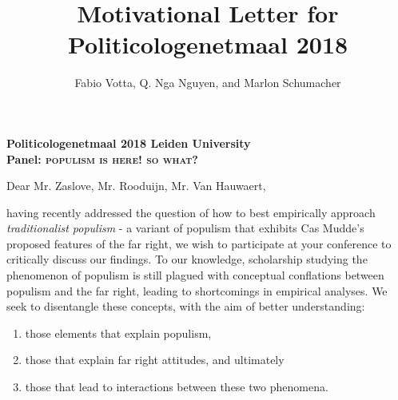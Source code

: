 \documentclass[10pt]{article}
\begin{document}
\title{Motivational Letter for Politicologenetmaal 2018}

\author{Fabio Votta, Q. Nga Nguyen, and Marlon Schumacher}

\address{B.A. University of Stuttgart, Department for Empirical Social Research, \href{fabio.votta@gmail.com}{fabio.votta@gmail.com}\\
B.A. Institut d'Etudes Politiques de Bordeaux/ University of Stuttgart,\\ Department of Political Theory and Empirical Democracy Research,  \href{nga.nguyen@scpobx.fr}{nga.nguyen@scpobx.fr}\\
B.A. University of Stuttgart, Frauenhofer Society, 
\href{M.C.Schumacher@live.de}{m.c.schumacher@live.de}}





\vspace{0.4cm} 
\begin{center}
\noindent \textbf{\large Politicologenetmaal 2018 Leiden University \\ Panel: \textsc{populism is here! so what?}}
\end{center}
\vspace{0.2cm}

\noindent Dear Mr. Zaslove,
\noindent Mr. Rooduijn,
\noindent Mr. Van Hauwaert,

\vspace{0.3cm}

having recently addressed the question of how to best empirically approach \textit{traditionalist populism} - a variant of populism that exhibits Cas Mudde's proposed features of the far right, we wish to participate at your conference to critically discuss our findings. To our knowledge, scholarship studying the phenomenon of populism is still plagued with conceptual conflations between populism and the far right, leading to shortcomings in empirical analyses. We seek to disentangle these concepts, with the aim of better understanding:
\begin{enumerate}
\item those elements that explain populism, 
\item those that explain far right attitudes, and ultimately
\item those that lead to interactions between these two phenomena.
\end{enumerate}
\end{document}
